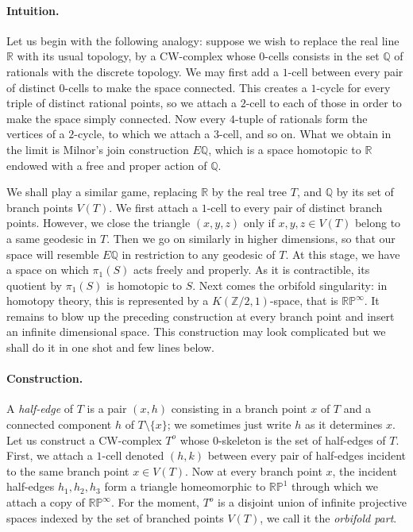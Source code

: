 \documentclass{amsart}
\newcommand{\R}{\mathbb{R}}
\newcommand{\Q}{\mathbb{Q}}
\newcommand{\Z}{\mathbb{Z}}
\renewcommand{\P}{\mathbb{P}}
\begin{document}
\paragraph{Intuition.}
Let us begin with the following analogy: suppose we wish to replace the real line $\R$ with its usual topology, by a CW-complex whose $0$-cells consists in the set $\Q$ of rationals with the discrete topology. We may first add a $1$-cell between every pair of distinct $0$-cells to make the space connected. This creates a $1$-cycle for every triple of distinct rational points, so we attach a $2$-cell to each of those in order to make the space simply connected. Now every $4$-tuple of rationals form the vertices of a $2$-cycle, to which we attach a $3$-cell, and so on.
%
What we obtain in the limit is Milnor's join construction $E\Q$, which is a space homotopic to $\R$ endowed with a free and proper action of $\Q$. 

We shall play a similar game, replacing $\R$ by the real tree $T$, and $\Q$ by its set of branch points $V(T)$. We first attach a $1$-cell to every pair of distinct branch points. However, we close the triangle $(x,y,z)$ only if $x,y,z \in V(T)$ belong to a same geodesic in $T$. Then we go on similarly in higher dimensions, so that our space will resemble $E\Q$ in restriction to any geodesic of $T$. At this stage, we have a space on which $\pi_1(S)$ acts freely and properly. As it is contractible, its quotient by $\pi_1(S)$ is homotopic to $S$.
%
Next comes the orbifold singularity: in homotopy theory, this is represented by a $K(\Z/2,1)$-space, that is $\R\P^\infty$. It remains to blow up the preceding construction at every branch point and insert an infinite dimensional space. This construction may look complicated but we shall do it in one shot and few lines below.

\paragraph{Construction.}
A \emph{half-edge} of $T$ is a pair $(x,h)$ consisting in a branch point $x$ of $T$ and a connected component $h$ of $T\setminus\{x\}$; we sometimes just write $h$ as it determines $x$. Let us construct a CW-complex $T^o$ whose $0$-skeleton is the set of half-edges of $T$.
%
First, we attach a $1$-cell denoted $(h,k)$ between every pair of half-edges incident to the same branch point $x\in V(T)$. 
%
Now at every branch point $x$, the incident half-edges $h_1,h_2,h_3$ form a triangle homeomorphic to $\R\P^1$ through which we attach a copy of $\R\P^\infty$.
%
For the moment, $T^o$ is a disjoint union of infinite projective spaces indexed by the set of branched points $V(T)$, we call it the \emph{orbifold part}.
\end{document}
